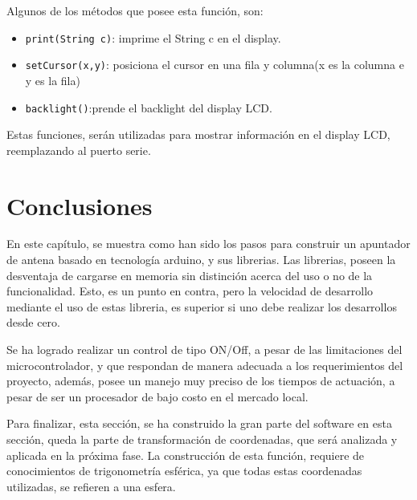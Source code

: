 Algunos de los métodos que posee esta función, son: 
\begin{itemize}
	\item \texttt{print(String c)}: imprime el String c en el display. 
	\item \texttt{setCursor(x,y)}: posiciona el cursor en una fila y columna(x es la columna e y es la fila) 
	\item \texttt{backlight()}:prende el backlight del display LCD.   
\end{itemize}

Estas funciones, serán utilizadas para mostrar información en el display LCD, reemplazando al puerto serie. 


\section{Conclusiones}


En este capítulo, se muestra como han sido los pasos para construir un apuntador de antena basado en tecnología arduino, y sus librerias. Las librerias, poseen la desventaja de cargarse en memoria sin distinción acerca del uso o no de la funcionalidad. Esto, es un punto en contra, pero la velocidad de desarrollo mediante el uso de estas libreria, es superior si uno debe realizar los desarrollos desde cero.  

Se ha logrado realizar un control de tipo ON/Off, a pesar de las limitaciones del microcontrolador, y que respondan de manera adecuada a los requerimientos del proyecto, además, posee un manejo muy preciso de los tiempos de actuación, a pesar de ser un procesador de bajo costo en el mercado local. 


Para finalizar, esta sección, se ha construido la gran parte del software en esta sección, queda la parte de transformación de coordenadas, que será analizada y aplicada en la próxima fase. La construcción de esta función, requiere de conocimientos de trigonometría esférica, ya que todas estas coordenadas utilizadas, se refieren a una esfera. 



